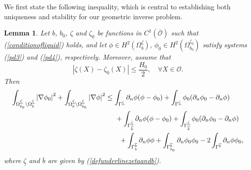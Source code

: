 \documentclass[11pt]{article}
\newtheorem{lemma}[theorem]{Lemma}
\begin{document}
We first state the following inequality, which is central to establishing both uniqueness and stability for our geometric inverse problem.
\begin{lemma}\label{Lemma1useful}
	Let $b$, $b_0$, $\zeta$ and $\zeta_0$ be functions in $C^1\left(\overline{\mathcal O }\right)$ such that (\ref{conditionofliquid}) holds, and  let $\phi\in H^2(\Omega^{\zeta}_{b})$, $\phi_0\in H^2(\Omega^{\zeta_0}_{b_0})$ satisfy systems  (\ref{pd3}) and (\ref{pd4}), respectively. Moreover, assume that
	\begin{equation}\label{conditiononsurfaces}
		|\zeta(X)-\zeta_0(X)|\leq \frac{H_0}{2},\quad \forall X\in \mathcal O .  
	\end{equation}
	Then
	\begin{equation}\label{inequality1}
		\begin{split}
			\displaystyle\int_{\Omega_{b_0}^{\underline{\zeta}}\backslash \Omega_{b}^{\underline{\zeta}}}\left|\nabla\phi_0\right|^2+\displaystyle\int_{\Omega_{b}^{\underline{\zeta}}\backslash \Omega_{b_0}^{\underline{\zeta}}}\left|\nabla\phi\right|^2
			&\leq \displaystyle\int_{\Gamma^{\underline{\zeta}}} \partial_n\phi(\phi-\phi_0)+\displaystyle\int_{\Gamma^{\underline{\zeta}}} \phi_0(\partial_n\phi_0-\partial_n\phi)\\
			&\hspace{0.5cm}+\displaystyle\int_{\Gamma_{\overline{b}}^{\underline{\zeta}}} \partial_n\phi(\phi-\phi_0)+\displaystyle\int_{\Gamma_{\overline{b}}^{\underline{\zeta}}} \phi_0(\partial_n\phi_0-\partial_n\phi)\\
			&\hspace{0.7cm}+\displaystyle\int_{\Gamma_{b}^{\overline{b}}} \partial_n\phi \phi + \displaystyle\int_{\Gamma_{b_0}^{\overline{b}}} \partial_n\phi_0 \phi_0-2\displaystyle\int_{\Gamma^{\overline{b}}} \partial_n\phi \phi_0, 
		\end{split}
	\end{equation}
	where $\underline{\zeta}$ and $\overline{b}$ are given by (\ref{defunderlinezetaandb}). 
\end{lemma}
\end{document}
